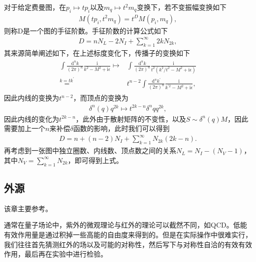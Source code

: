 \documentclass[aps,tightenlines,16pt]{ctexart}
\numberwithin{equation}{section}
\begin{document}
对于给定费曼图，在$p_i \mapsto t p_i$以及$m_q \mapsto t^2 m_q$变换下，若不变振幅变换如下
\begin{align}
   M(tp_i,t^2m_q) = t^D M(p_i,m_q),
\end{align}
则称D是一个图的手征阶数。手征阶数的计算公式如下
\begin{align}
   D = nN_L-2N_I + \sum_{k=1}^{\infty} 2k N_{2k},
\end{align}
其来源简单阐述如下，在上述标度变化下，传播子的变换如下
\begin{align}
   \begin{aligned}
      \int \frac{\mbox{d}^nk}{(2\pi)^n}\frac{\mbox{i}}{k^2-M^2+\mbox{i}\epsilon} 
      \mapsto& \int \frac{\mbox{d}^nk}{(2\pi)^n}\frac{\mbox{i}}{t^2(k^2/t^2-M^2+\mbox{i}\epsilon)}\\
      \stackrel{k=tk^{\prime}}{=}& t^{n-2}\int \frac{\mbox{d}^n k^{\prime}}{(2\pi)^n}\frac{\mbox{i}}{k^{\prime 2}-M^2+\mbox{i}\epsilon},
   \end{aligned}
\end{align}
因此内线的变换为$t^{n-2}$，而顶点的变换为
\begin{align}
   \delta^n(q)q^{2k} \mapsto t^{2k-n}\delta^n{q}q^{2k},
\end{align}
因此内线的变化为$t^{2k-n}$，此外由于散射矩阵的不变性，以及$S\sim\delta^n(q)M$，因此需要加上一个$n$来补偿$\delta$函数的影响，此时我们可以得到
\begin{align}
   D = n + (n-2)N_I + \sum_{k=1}^{\infty} N_{2k}(2k-n).
\end{align}
再考虑到一张图中独立圈数、内线数、顶点数之间的关系$N_L = N_I - (N_V - 1)$，其中$N_V=\sum_{k=1}^{\infty}N_{2k}$，即可得到上式。

\subsection{外源}
该章主要参考\cite{scherer2011primer}。

通常在量子场论中，紫外的微观理论与红外的理论可以截然不同，如QCD。低能有效作用量是通过积掉一些高能的自由度来得到的。但是在实际操作中很难实行，我们往往首先猜测红外的场以及可能的对称性，然后写下与对称性自洽的有效有效作用，最后再在实验中进行检验。
\end{document}
